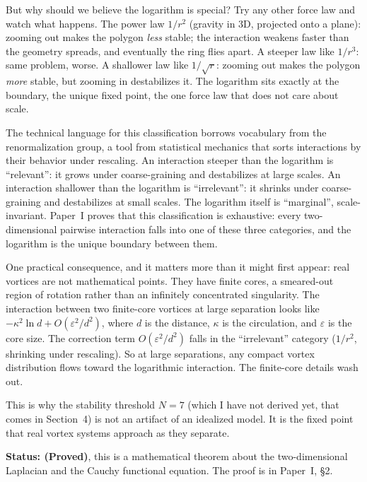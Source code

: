 But why should we believe the logarithm is special? Try any other
force law and watch what happens. The power law $1/r^2$ (gravity in
3D, projected onto a plane): zooming out makes the polygon \emph{less}
stable; the interaction weakens faster than the geometry spreads, and
eventually the ring flies apart. A steeper law like $1/r^3$: same
problem, worse. A shallower law like $1/\sqrt{r}$: zooming out makes
the polygon \emph{more} stable, but zooming in destabilizes it. The
logarithm sits exactly at the boundary, the unique fixed point, the
one force law that does not care about scale.

The technical language for this classification borrows vocabulary from
the renormalization group, a tool from statistical mechanics that
sorts interactions by their behavior under rescaling. An interaction
steeper than the logarithm is ``relevant'': it grows under
coarse-graining and destabilizes at large scales. An interaction
shallower than the logarithm is ``irrelevant'': it shrinks under
coarse-graining and destabilizes at small scales. The logarithm itself
is ``marginal'', scale-invariant. Paper~I proves that this
classification is exhaustive: every two-dimensional pairwise
interaction falls into one of these three categories, and the
logarithm is the unique boundary between them.

One practical consequence, and it matters more than it might first
appear: real vortices are not mathematical points. They have finite
cores, a smeared-out region of rotation rather than an infinitely
concentrated singularity. The interaction between two
finite-core vortices at large separation looks like
$-\kappa^2 \ln d + O(\varepsilon^2/d^2)$, where $d$ is the distance,
$\kappa$ is the circulation, and $\varepsilon$ is the core size. The
correction term $O(\varepsilon^2/d^2)$ falls in the ``irrelevant''
category ($1/r^2$, shrinking under rescaling). So at large
separations, any compact vortex distribution flows toward the
logarithmic interaction. The finite-core details wash out.

This is why the stability threshold $N = 7$ (which I have not derived
yet, that comes in Section~4) is not an artifact of an idealized
model. It is the fixed point that real vortex systems approach as
they separate.

\textbf{Status: (Proved)}, this is a mathematical theorem about the
two-dimensional Laplacian and the Cauchy functional equation. The
proof is in Paper~I, \S2.


